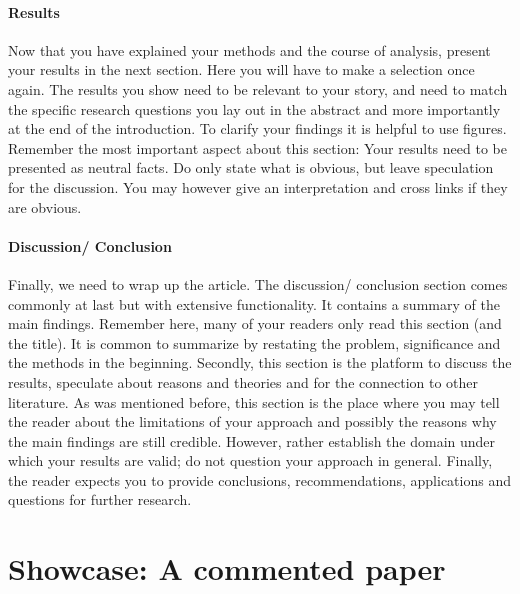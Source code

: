 \documentclass{tufte-book}
\begin{document}
\paragraph{Results}
Now that you have explained your methods and the course of analysis, present your results in the next section.%
Here you will have to make a selection once again. The results you show need to be relevant to your story, and need to match the specific research questions you lay out in the abstract and more importantly at the end of the introduction. To clarify your findings it is helpful to use figures.
Remember the most important aspect about this section: Your results need to be presented as neutral facts. Do only state what is obvious, but leave speculation for the discussion. You may however give an interpretation and cross links if they are obvious.\\

\paragraph{Discussion/ Conclusion}
Finally, we need to wrap up the article.%
The discussion/ conclusion section comes commonly at last but with extensive functionality. It contains a summary of the main findings. Remember here, many of your readers only read this section (and the title). It is common to summarize by restating the problem, significance and the methods in the beginning. Secondly, this section is the platform to discuss the results, speculate about reasons and theories and for the connection to other literature.
As was mentioned before, this section is the place where you may tell the reader about the limitations of your approach and possibly the reasons why the main findings are still credible. However, rather establish the domain under which your results are valid; do not question your approach in general. Finally, the reader expects you to provide conclusions, recommendations, applications and questions for further research.\\

\section{Showcase: A commented paper}
\end{document}
